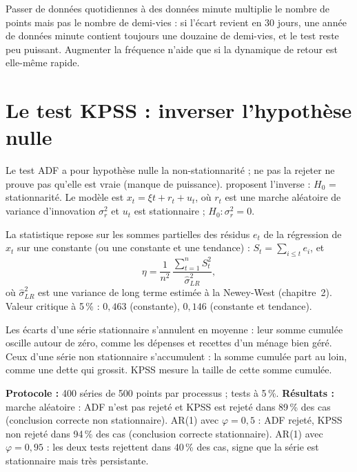 \begin{pitfall}
Passer de données quotidiennes à des données minute multiplie le nombre de points mais pas le nombre de demi-vies : si l'écart revient en 30 jours, une année de données minute contient toujours une douzaine de demi-vies, et le test reste peu puissant. Augmenter la fréquence n'aide que si la dynamique de retour est elle-même rapide.
\end{pitfall}

\section{Le test KPSS : inverser l'hypothèse nulle}

Le test ADF a pour hypothèse nulle la non-stationnarité ; ne pas la rejeter ne prouve pas qu'elle est vraie (manque de puissance). \citet{kpss1992} proposent l'inverse : $H_0$ = stationnarité. Le modèle est $x_t = \xi t + r_t + u_t$, où $r_t$ est une marche aléatoire de variance d'innovation $\sigma_r^2$ et $u_t$ est stationnaire ; $H_0 : \sigma_r^2 = 0$.

La statistique repose sur les sommes partielles des résidus $e_t$ de la régression de $x_t$ sur une constante (ou une constante et une tendance) : $S_t = \sum_{i\le t} e_i$, et
\[
\eta = \frac{1}{n^2}\,\frac{\sum_{t=1}^n S_t^2}{\hat\sigma^2_{LR}},
\]
où $\hat\sigma^2_{LR}$ est une variance de long terme estimée à la Newey-West (chapitre~2). Valeur critique à 5\,\% : $0{,}463$ (constante), $0{,}146$ (constante et tendance).

\begin{intuition}
Les écarts d'une série stationnaire s'annulent en moyenne : leur somme cumulée oscille autour de zéro, comme les dépenses et recettes d'un ménage bien géré. Ceux d'une série non stationnaire s'accumulent : la somme cumulée part au loin, comme une dette qui grossit. KPSS mesure la taille de cette somme cumulée.
\end{intuition}

\begin{codebox}
\textbf{Protocole :} 400 séries de 500 points par processus ; tests à 5\,\%. \textbf{Résultats :} marche aléatoire : ADF n'est pas rejeté et KPSS est rejeté dans 89\,\% des cas (conclusion correcte \og non stationnaire\fg). AR(1) avec $\varphi = 0{,}5$ : ADF rejeté, KPSS non rejeté dans 94\,\% des cas (conclusion correcte \og stationnaire\fg). AR(1) avec $\varphi = 0{,}95$ : les deux tests rejettent dans 40\,\% des cas, signe que la série est stationnaire mais très persistante.
\end{codebox}

